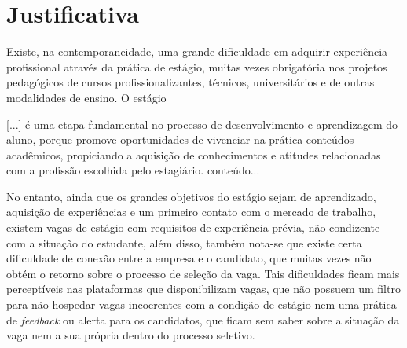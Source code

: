 \section{Justificativa} \label{justificativa}
Existe, na contemporaneidade, uma grande dificuldade em adquirir experiência profissional através da prática de estágio, muitas vezes obrigatória nos projetos pedagógicos de cursos profissionalizantes, técnicos, universitários e de outras modalidades de ensino. O estágio
\begin{quoting}[rightmargin=0cm,leftmargin=4cm]
	\begin{SingleSpace}
		{\footnotesize
		[...] é uma etapa fundamental no processo de desenvolvimento e aprendizagem do aluno, porque promove oportunidades de vivenciar na prática conteúdos acadêmicos, propiciando a aquisição de conhecimentos e atitudes relacionadas com a profissão escolhida pelo estagiário. \cite{ciee}
		}
		conteúdo...
	\end{SingleSpace}
\end{quoting}

No entanto, ainda que os grandes objetivos do estágio sejam de aprendizado, aquisição de experiências e um primeiro contato com o mercado de trabalho, existem vagas de estágio com requisitos de experiência prévia, não condizente com a situação do estudante, além disso, também nota-se que existe certa dificuldade de conexão entre a empresa e o candidato, que muitas vezes não obtém o retorno sobre o processo de seleção da vaga.
Tais dificuldades ficam mais perceptíveis nas plataformas que disponibilizam vagas, que não possuem um filtro para não hospedar vagas incoerentes com a condição de estágio nem uma prática de \textit{feedback} ou alerta para os candidatos, que ficam sem saber sobre a situação da vaga nem a sua própria dentro do processo seletivo.